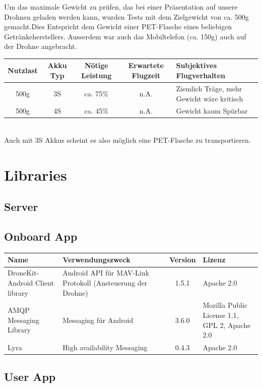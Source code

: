 Um das maximale Gewicht zu prüfen, das bei einer Präsentation auf unsere Drohnen geladen werden kann, wurden Tests mit dem Zielgewicht von ca. 500g gemacht.Dies Entspricht dem Gewicht einer PET-Flasche eines beliebigen Getränkeherstellers. Ausserdem war auch das Mobiltelefon (ca. 150g) auch auf der Drohne angebracht.  \\

\begin{tabularx}{\textwidth}{|c|c|c|c|X|}
	\hline
	\textbf{Nutzlast} & \textbf{Akku Typ} & \textbf{Nötige Leistung }& \textbf{Erwartete Flugzeit } & \textbf{Subjektives Flugverhalten }\\
	\hline \hline
	500g & 3S & ca. 75\%  & n.A. & Ziemlich Träge, mehr Gewicht wäre kritisch\\
	\hline
	500g & 4S & ca. 45\%  & n.A. & Gewicht kaum Spürbar\\
	\hline  
\end{tabularx}\\

Auch mit 3S Akkus scheint es also möglich eine PET-Flasche zu transportieren. 

\section{Libraries}

\subsection{Server}


\subsection{Onboard App}
\begin{tabularx}{\textwidth}{|X|X|c|X|}
	\hline
	\textbf{Name} & \textbf{Verwendungszweck} & \textbf{Version} & \textbf{Lizenz} \\
	\hline \hline
	DroneKit-Android Client library & Android API für MAV-Link Protokoll (Ansteuerung der Drohne) & 1.5.1 & Apache 2.0\\
	\hline 
	AMQP Messaging Library & Messaging für Android & 3.6.0 &  Mozilla Public License 1.1, GPL 2,  Apache 2.0 \\
	\hline 
	Lyra  & High availability Messaging & 0.4.3 &  Apache 2.0 \\
	\hline 
\end{tabularx}
\subsection{User App}


